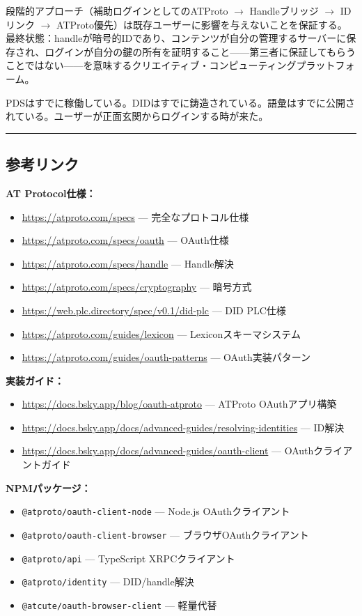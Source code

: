 \documentclass[10pt,letterpaper,twocolumn]{article}
\begin{document}
段階的アプローチ（補助ログインとしてのATProto $\to$ Handleブリッジ $\to$ IDリンク $\to$ ATProto優先）は既存ユーザーに影響を与えないことを保証する。最終状態：handleが暗号的IDであり、コンテンツが自分の管理するサーバーに保存され、ログインが自分の鍵の所有を証明すること——第三者に保証してもらうことではない——を意味するクリエイティブ・コンピューティングプラットフォーム。

PDSはすでに稼働している。DIDはすでに鋳造されている。語彙はすでに公開されている。ユーザーが正面玄関からログインする時が来た。


\vspace{0.5em}
\noindent\rule{\columnwidth}{0.5pt}

\subsection*{参考リンク}

\noindent\small

\textbf{AT Protocol仕様：}
\begin{itemize}
  \item \url{https://atproto.com/specs} --- 完全なプロトコル仕様
  \item \url{https://atproto.com/specs/oauth} --- OAuth仕様
  \item \url{https://atproto.com/specs/handle} --- Handle解決
  \item \url{https://atproto.com/specs/cryptography} --- 暗号方式
  \item \url{https://web.plc.directory/spec/v0.1/did-plc} --- DID PLC仕様
  \item \url{https://atproto.com/guides/lexicon} --- Lexiconスキーマシステム
  \item \url{https://atproto.com/guides/oauth-patterns} --- OAuth実装パターン
\end{itemize}

\textbf{実装ガイド：}
\begin{itemize}
  \item \url{https://docs.bsky.app/blog/oauth-atproto} --- ATProto OAuthアプリ構築
  \item \url{https://docs.bsky.app/docs/advanced-guides/resolving-identities} --- ID解決
  \item \url{https://docs.bsky.app/docs/advanced-guides/oauth-client} --- OAuthクライアントガイド
\end{itemize}

\textbf{NPMパッケージ：}
\begin{itemize}
  \item \texttt{@atproto/oauth-client-node} --- Node.js OAuthクライアント
  \item \texttt{@atproto/oauth-client-browser} --- ブラウザOAuthクライアント
  \item \texttt{@atproto/api} --- TypeScript XRPCクライアント
  \item \texttt{@atproto/identity} --- DID/handle解決
  \item \texttt{@atcute/oauth-browser-client} --- 軽量代替
\end{itemize}
\end{document}
